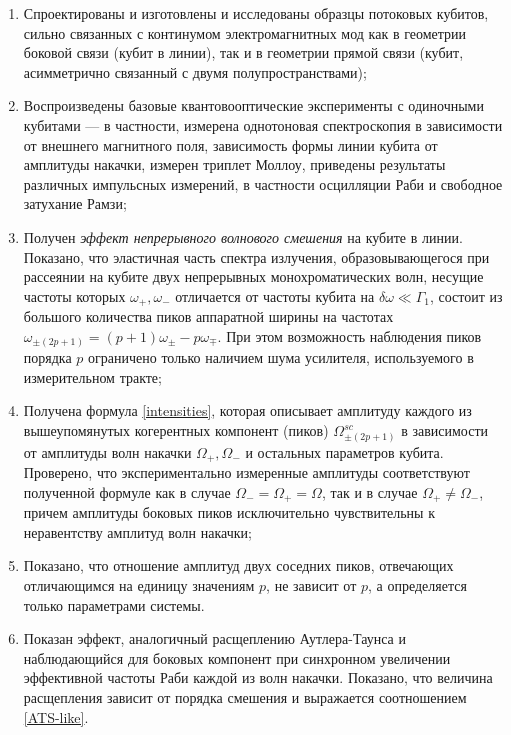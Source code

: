 \begin{enumerate}
  \item Спроектированы и изготовлены и исследованы образцы потоковых кубитов, сильно связанных с континумом электромагнитных мод как в геометрии боковой связи (кубит в линии), так и в геометрии прямой связи (кубит, асимметрично связанный с двумя полупространствами);
  \item Воспроизведены базовые квантовооптические эксперименты с одиночными кубитами --- в частности, измерена однотоновая спектроскопия в зависимости от внешнего магнитного поля, зависимость формы линии кубита от амплитуды накачки, измерен триплет Моллоу, приведены результаты различных импульсных измерений, в частности осцилляции Раби и свободное затухание Рамзи;
  \item Получен \textit{эффект непрерывного волнового смешения} на кубите в линии. Показано, что эластичная часть спектра излучения, образовывающегося при рассеянии на кубите двух непрерывных монохроматических волн, несущие частоты которых $\omega_+, \omega_-$ отличается от частоты кубита на $\delta\omega \ll \Gamma_1$, состоит из большого количества пиков аппаратной ширины на частотах $\omega_{\pm(2p+1)}= (p+1)\omega_{\pm}-p \omega_{\mp}$.  При этом возможность наблюдения пиков порядка $p$ ограничено только наличием шума усилителя, используемого в измерительном тракте;
  \item Получена формула \eqref{intensities}, которая описывает амплитуду каждого из вышеупомянутых когерентных компонент (пиков) $\Omega^{sc}_{\pm(2p+1)}$ в зависимости от амплитуды волн накачки $\Omega_+, \Omega_-$ и остальных параметров кубита. Проверено, что экспериментально измеренные амплитуды соответствуют полученной формуле как в случае $\Omega_- = \Omega _+ = \Omega$, так и в случае $\Omega_+ \ne \Omega_-$, причем амплитуды боковых пиков исключительно чувствительны к неравентству амплитуд волн накачки;
  \item Показано, что отношение амплитуд двух соседних пиков, отвечающих отличающимся на единицу значениям $p$, не зависит от $p$, а определяется только параметрами системы. 
  \item Показан эффект, аналогичный расщеплению Аутлера-Таунса и наблюдающийся для боковых компонент при синхронном увеличении эффективной частоты Раби каждой из волн накачки. Показано, что величина расщепления зависит от порядка смешения и выражается соотношением \eqref{ATS-like}.

\end{enumerate}
